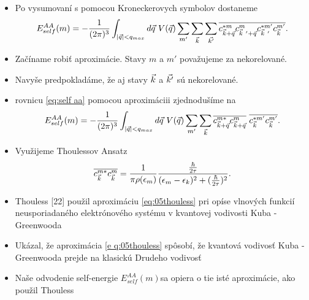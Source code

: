 \documentclass[
	11pt, %
]{beamer}
\begin{document}
\begin{frame}
\begin{itemize}
\item Po vysumovaní s pomocou Kroneckerovych symbolov dostaneme
\begin{align}
\label{eq:self aa}
E_{self}^{AA}(m)= - \frac{1}{(2\pi)^3}\int_{|\vq| < q_{max}} d\vq\ V(\vq) \sum_{m'}\sum_{\vk}\sum_{\vkp}\overline{c^{*m}_{\vk+\vq}c^{m}_{\vk\ '+\vq}c^{*m'}_{\vk\ '}c^{m'}_{\vk}}\text{.}
\end{align}
\item Začíname robiť aproximácie. Stavy $m$ a $m'$ považujeme za nekorelované. 
\item Navyše predpokladáme, že aj stavy $\vec{k}$ a $\vec{k'}$ sú nekorelované.
\item rovnicu \eqref{eq:self aa} pomocou aproximáciii zjednodušíme na
\begin{align}
\label{eq:05energy2}
E_{self}^{AA}(m)= - \frac{1}{(2\pi)^3} \int_{|\vq| < q_{max}} d\vq\ V(\vq) \sum_{m'}\sum_{\vk} \overline{c^{m*}_{\vk+\vq}c^{m}_{\vk+\vq}}\ \overline{c^{*m'}_{\vk}c^{m'}_{\vk}} \text{.}
\end{align}
\end{itemize}
\end{frame}
\begin{frame}
\begin{itemize}
\item Využijeme Thoulessov Ansatz
\begin{align}
\label{eq:05thouless}
\overline{c^{m*}_{\vec{k}}c^{m}_{\vec{k}}}=\frac{1}{\pi \rho(\epsilon_m)}\frac{\frac{\hbar}{2\tau}}{(\epsilon_m-\epsilon_{k})^2+(\frac{\hbar}{2\tau})^2} \text{.}
\end{align}
\item Thouless [22] použil aproximáciu \eqref{eq:05thouless} pri opíse vlnových funkcií neusporiadaného elektrónového systému v kvantovej vodivosti Kuba - Greenwooda
\item Ukázal, že aproximácia \eqref{e q:05thouless} spôsobí, že kvantová vodivosť Kuba - Greenwooda prejde na klasickú Drudeho vodivosť
\item Naše odvodenie self-energie  $E_{self}^{AA}(m)$sa opiera o tie isté aproximácie, ako použil Thouless
\end{itemize}
\end{frame}
\end{document}

